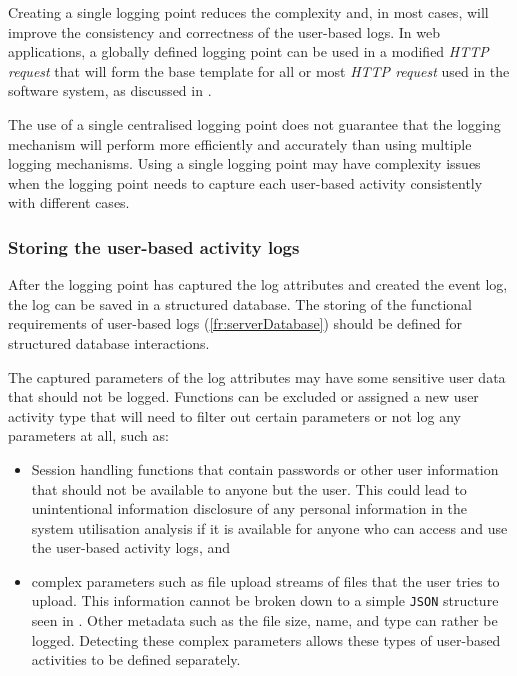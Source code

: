 Creating a single logging point reduces the complexity and, in most cases, will improve the consistency and correctness of the user-based logs. In web applications, a globally defined logging point can be used in a modified \textit{HTTP request} that will form the base template for all or most \textit{HTTP request} used in the software system, as discussed in . \par The use of a single centralised logging point does not guarantee that the logging mechanism will perform more efficiently and accurately than using multiple logging mechanisms. Using a single logging point may have complexity issues when the logging point needs to capture each user-based activity consistently with different cases.

\subsubsection{Storing the user-based activity logs}\label{sec:ch2_databaseStorage}
After the logging point has captured the log attributes and created the event log, the log can be saved in a structured database. The storing of the functional requirements of user-based logs (\ref{fr:serverDatabase}) should be defined for structured database interactions.\par The captured parameters of the log attributes may have some sensitive user data that should not be logged. Functions can be excluded or assigned a new user activity type that will need to filter out certain parameters or not log any parameters at all, such as:

\begin{itemize}
	\item Session handling functions that contain passwords or other user information that should not be available to anyone but the user. This could lead to unintentional information disclosure of any personal information in the system utilisation analysis if it is available for anyone who can access and use the user-based activity logs, and
	\item complex parameters such as file upload streams of files that the user tries to upload. This information cannot be broken down to a simple \texttt{JSON} structure seen in . Other metadata such as the file size, name, and type can rather be logged. Detecting these complex parameters allows these types of user-based activities to be defined separately.
\end{itemize}


